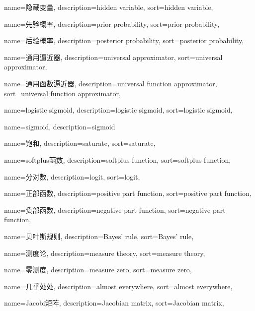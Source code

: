 {
  name=隐藏变量,
  description={hidden variable},
  sort={hidden variable},
}

{
  name=先验概率,
  description={prior probability},
  sort={prior probability},
}

{
  name=后验概率,
  description={posterior probability},
  sort={posterior probability},
}

{
  name=通用逼近器,
  description={universal approximator},
  sort={universal approximator},
}

{
  name=通用函数逼近器,
  description={universal function approximator},
  sort={universal function approximator},
}

{
  name=logistic sigmoid,
  description={logistic sigmoid},
  sort={logistic sigmoid},
}

{
  name=sigmoid,
  description={sigmoid}
}

{
  name=饱和,
  description={saturate},
  sort={saturate},
}

{
  name=softplus函数,
  description={softplus function},
  sort={softplus function},
}

{
  name=分对数,
  description={logit},
  sort={logit},
}

{
  name=正部函数,
  description={positive part function},
  sort={positive part function},
}

{
  name=负部函数,
  description={negative part function},
  sort={negative part function},
}

{
  name=贝叶斯规则,
  description={Bayes' rule},
  sort={Bayes' rule},
}

{
  name=测度论,
  description={measure theory},
  sort={measure theory},
}

{
  name=零测度,
  description={measure zero},
  sort={measure zero},
}

{
  name=几乎处处,
  description={almost everywhere},
  sort={almost everywhere},
}

{
  name=Jacobi矩阵,
  description={Jacobian matrix},
  sort={Jacobian matrix},
}

